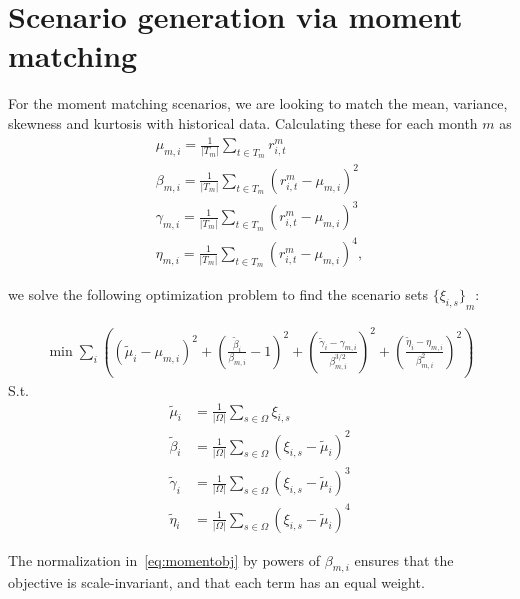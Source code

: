 \section{Scenario generation via moment matching}

For the moment matching scenarios, we are looking to match the mean, variance, skewness and kurtosis with historical data.
Calculating these for each month $m$ as
\begin{gather}
\mu_{m,i} = \frac{1}{|T_m|} \sum_{t \in T_m} r^m_{i,t} \\
\beta_{m,i} = \frac{1}{|T_m|} \sum_{t \in T_m} {\left( r^m_{i,t} - \mu_{m,i} \right)}^2 \\
\gamma_{m,i} = \frac{1}{|T_m|} \sum_{t \in T_m} {\left( r^m_{i,t} - \mu_{m,i} \right)}^3 \\
\eta_{m,i} = \frac{1}{|T_m|} \sum_{t \in T_m} {\left( r^m_{i,t} - \mu_{m,i} \right)}^4 ,
\end{gather}

we solve the following optimization problem to find the scenario sets ${\{\xi_{i,s}\}}_{m}$:

\begin{align}
\min \sum_i \left(
	{(\tilde{\mu}_i - \mu_{m,i})}^2 +
	{\left( \frac{\tilde{\beta}_i}{\beta_{m,i}} - 1 \right)}^2 +
	{\left( \frac{\tilde{\gamma}_i - \gamma_{m,i}}{\beta_{m,i}^{3/2}} \right)}^2 +
	{\left( \frac{\tilde{\eta}_i - \eta_{m,i}}{\beta_{m,i}^{2}} \right)}^2
\right)
\label{eq:momentobj}
\end{align}
S.t.
\begin{align}
\tilde{\mu}_i &= \frac{1}{|\Omega|} \sum_{s \in \Omega} \xi_{i,s} \\
\tilde{\beta}_i &= \frac{1}{|\Omega|} \sum_{s \in \Omega} {\left( \xi_{i,s} - \tilde{\mu}_i \right)}^2 \\
\tilde{\gamma}_i &= \frac{1}{|\Omega|} \sum_{s \in \Omega} {\left( \xi_{i,s} - \tilde{\mu}_i \right)}^3 \\
\tilde{\eta}_i &= \frac{1}{|\Omega|} \sum_{s \in \Omega} {\left( \xi_{i,s} - \tilde{\mu}_i \right)}^4
\end{align}

The normalization in~\eqref{eq:momentobj} by powers of $\beta_{m,i}$ ensures that the objective is scale-invariant, and that each term has an equal weight.
